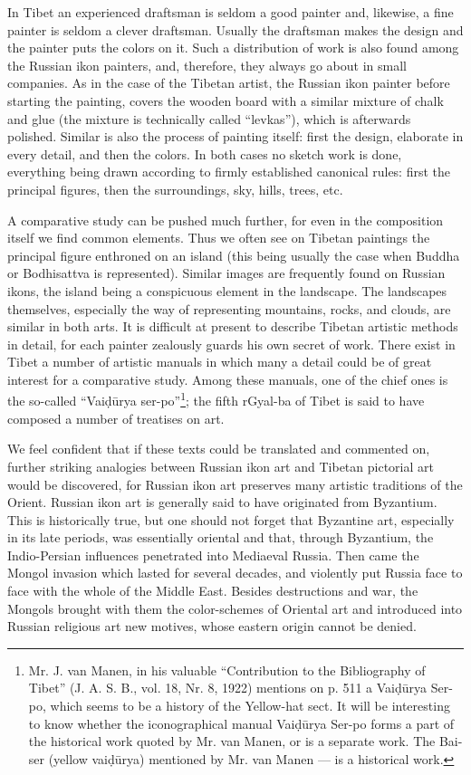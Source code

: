 \documentclass[a4paper, 12pt, oneside]{article}
\begin{document}
In Tibet an experienced draftsman is seldom a good painter and, likewise, a fine painter is seldom a clever draftsman. Usually the draftsman makes the design and the painter puts the colors on it. Such a distribution of work is also found among the Russian ikon painters, and, therefore, they always go about in small companies. As in the case of the Tibetan artist, the Russian ikon painter before starting the painting, covers the wooden board with a similar mixture of chalk and glue (the mixture is technically called ``levkas''), which is afterwards polished. Similar is also the process of painting itself: first the design, elaborate in every detail, and then the colors. In both cases no sketch work is done, everything being drawn according to firmly established canonical rules: first the principal figures, then the surroundings, sky, hills, trees, etc.

A comparative study can be pushed much further, for even in the composition itself we find common elements. Thus we often see on Tibetan paintings the principal figure enthroned on an island (this being usually the case when Buddha or Bodhisattva is represented). Similar images are frequently found on Russian ikons, the island being a conspicuous element in the landscape. The landscapes themselves, especially the way of representing mountains, rocks, and clouds, are similar in both arts. It is difficult at present to describe Tibetan artistic methods in detail, for each painter zealously guards his own secret of work. There exist in Tibet a number of artistic manuals in which many a detail could be of great interest for a comparative study. Among these manuals, one of the chief ones is the so-called ``Vai\d{d}\={u}rya ser-po''\footnote{Mr. J. van Manen, in his valuable ``Contribution to the Bibliography of Tibet'' (J. A. S. B., vol. 18, Nr. 8, 1922) mentions on p. 511 a Vai\d{d}\={u}rya Ser-po, which seems to be a history of the Yellow-hat sect. It will be interesting to know whether the iconographical manual Vai\d{d}\={u}rya Ser-po forms a part of the historical work quoted by Mr. van Manen, or is a separate work. The Bai-ser (yellow vai\d{d}\={u}rya) mentioned by Mr. van Manen --- is a historical work.}; the fifth rGyal-ba of Tibet is said to have composed a number of treatises on art.

We feel confident that if these texts could be translated and commented on, further striking analogies between Russian ikon art and Tibetan pictorial art would be discovered, for Russian ikon art preserves many artistic traditions of the Orient. Russian ikon art is generally said to have originated from Byzantium. This is historically true, but one should not forget that Byzantine art, especially in its late periods, was essentially oriental and that, through Byzantium, the Indio-Persian influences penetrated into Mediaeval Russia. Then came the Mongol invasion which lasted for several decades, and violently put Russia face to face with the whole of the Middle East. Besides destructions and war, the Mongols brought with them the color-schemes of Oriental art and introduced into Russian religious art new motives, whose eastern origin cannot be denied.
\end{document}
